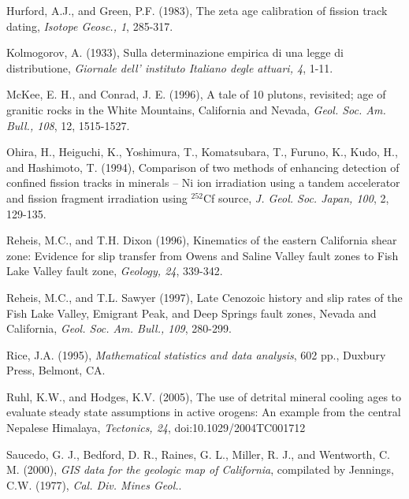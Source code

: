 \documentclass[12pt,twoside]{article}
\begin{document}
\begin{description}
\item Hurford, A.J., and Green,  P.F. (1983), The zeta age calibration
  of fission track dating, {\it Isotope Geosc., 1}, 285-317.
  
\item  Kolmogorov, A.  (1933),  Sulla determinazione  empirica di  una
  legge di distributione, {\it Giornale dell' instituto Italiano degle
    attuari, 4}, 1-11.
  
\item McKee, E.  H., and Conrad, J. E.  (1996), A  tale of 10 plutons,
  revisited; age of granitic  rocks in the White Mountains, California
  and Nevada,  {\it Geol. Soc. Am.  Bull., 108}, 12,
  1515-1527.
  
\item Ohira, H., Heiguchi, K., Yoshimura, T., Komatsubara, T., Furuno,
  K., Kudo, H., and Hashimoto, T. (1994), Comparison of two methods of
  enhancing detection of confined fission tracks in minerals -- Ni ion
  irradiation  using   a  tandem  accelerator   and  fission  fragment
  irradiation using $^{252}$Cf source, {\it J. Geol. Soc. Japan, 100},
  2, 129-135.
  
\item Reheis, M.C., and T.H.   Dixon (1996), Kinematics of the eastern
  California  shear zone: Evidence  for slip  transfer from  Owens and
  Saline  Valley fault  zones to  Fish  Lake Valley  fault zone,  {\it
    Geology, 24}, 339-342.
  
\item Reheis, M.C., and T.L.  Sawyer (1997), Late Cenozoic history and
  slip rates of the Fish  Lake Valley, Emigrant Peak, and Deep Springs
  fault zones, Nevada and California, {\it Geol. Soc. Am. Bull., 109},
  280-299.
  
\item  Rice,  J.A.   (1995),  {\it Mathematical  statistics  and  data
    analysis}, 602 pp., Duxbury Press, Belmont, CA.
  
\item Ruhl, K.W., and Hodges, K.V. (2005), The use of detrital mineral
  cooling ages to evaluate steady state assumptions in active orogens:
  An example from the  central Nepalese Himalaya, {\it Tectonics, 24},
  doi:10.1029/2004TC001712
  
\item Saucedo, G.  J., Bedford, D.  R., Raines, G.  L., Miller, R. J.,
  and Wentworth, C.  M.  (2000), {\it GIS data for the geologic map of
    California}, compilated by Jennings, C.W.  (1977), {\it Cal.  Div.
    Mines Geol.}.
  

\end{description}
\end{document}
